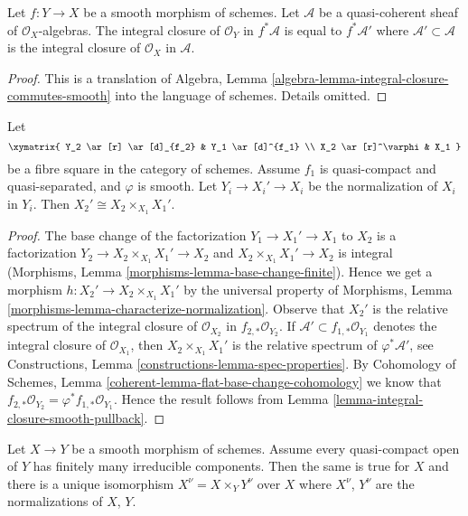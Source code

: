 \begin{lemma}
\label{lemma-integral-closure-smooth-pullback}
Let $f : Y \to X$ be a smooth morphism of schemes. Let $\mathcal{A}$ be a
quasi-coherent sheaf of $\mathcal{O}_X$-algebras. The integral closure
of $\mathcal{O}_Y$ in $f^*\mathcal{A}$ is equal to $f^*\mathcal{A}'$
where $\mathcal{A}' \subset \mathcal{A}$ is the integral closure of
$\mathcal{O}_X$ in $\mathcal{A}$.
\end{lemma}

\begin{proof}
This is a translation of
Algebra, Lemma \ref{algebra-lemma-integral-closure-commutes-smooth}
into the language of schemes. Details omitted.
\end{proof}

\begin{lemma}
\label{lemma-normalization-smooth-localization}
Let
$$
\xymatrix{
Y_2 \ar[r] \ar[d]_{f_2} & Y_1 \ar[d]^{f_1} \\
X_2 \ar[r]^\varphi & X_1
}
$$
be a fibre square in the category of schemes. Assume $f_1$ is quasi-compact
and quasi-separated, and $\varphi$ is smooth.
Let $Y_i \to X_i' \to X_i$ be the normalization of $X_i$ in $Y_i$.
Then $X_2' \cong X_2 \times_{X_1} X_1'$.
\end{lemma}

\begin{proof}
The base change of the factorization $Y_1 \to X_1' \to X_1$ to $X_2$
is a factorization $Y_2 \to X_2 \times_{X_1} X_1' \to X_2$ and
$X_2 \times_{X_1} X_1' \to X_2$ is integral
(Morphisms, Lemma \ref{morphisms-lemma-base-change-finite}).
Hence we get a morphism
$h : X_2' \to X_2 \times_{X_1} X_1'$ by the universal property of
Morphisms, Lemma \ref{morphisms-lemma-characterize-normalization}.
Observe that $X_2'$ is the relative spectrum of the integral closure
of $\mathcal{O}_{X_2}$ in $f_{2, *}\mathcal{O}_{Y_2}$.
If $\mathcal{A}' \subset f_{1, *}\mathcal{O}_{Y_1}$ denotes the integral
closure of $\mathcal{O}_{X_1}$, then $X_2 \times_{X_1} X_1'$ is the
relative spectrum of $\varphi^*\mathcal{A}'$, see
Constructions, Lemma \ref{constructions-lemma-spec-properties}.
By
Cohomology of Schemes, Lemma \ref{coherent-lemma-flat-base-change-cohomology}
we know that $f_{2, *}\mathcal{O}_{Y_2} = \varphi^*f_{1, *}\mathcal{O}_{Y_1}$.
Hence the result follows from
Lemma \ref{lemma-integral-closure-smooth-pullback}.
\end{proof}

\begin{lemma}
\label{lemma-normalization-and-smooth}
Let $X \to Y$ be a smooth morphism of schemes. Assume every quasi-compact
open of $Y$ has finitely many irreducible components. Then the same
is true for $X$ and there is a unique isomorphism $X^\nu = X \times_Y Y^\nu$
over $X$ where $X^\nu$, $Y^\nu$ are the normalizations of $X$, $Y$.
\end{lemma}

